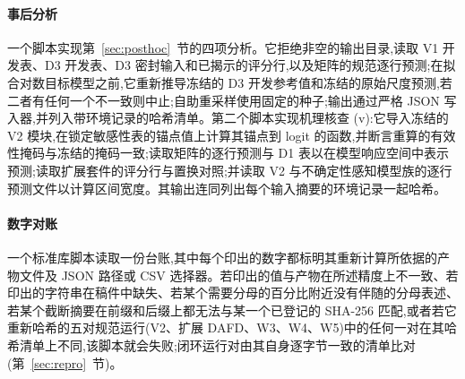 \documentclass[11pt,a4paper]{ctexart}
\begin{document}
\paragraph{事后分析} 一个脚本实现第~\ref{sec:posthoc}~节的四项分析。它拒绝非空的输出目录,读取 V1 开发表、D3 开发表、D3 密封输入和已揭示的评分行,以及矩阵的规范逐行预测;在拟合对数目标模型之前,它重新推导冻结的 D3 开发参考值和冻结的原始尺度预测,若二者有任何一个不一致则中止;自助重采样使用固定的种子;输出通过严格 JSON 写入器,并列入带环境记录的哈希清单。第二个脚本实现机理核查 (v):它导入冻结的 V2 模块,在锁定敏感性表的锚点值上计算其锚点到 logit 的函数,并断言重算的有效性掩码与冻结的掩码一致;读取矩阵的逐行预测与 D1 表以在模型响应空间中表示预测;读取扩展套件的评分行与置换对照;并读取 V2 与不确定性感知模型族的逐行预测文件以计算区间宽度。其输出连同列出每个输入摘要的环境记录一起哈希。

\paragraph{数字对账} 一个标准库脚本读取一份台账,其中每个印出的数字都标明其重新计算所依据的产物文件及 JSON 路径或 CSV 选择器。若印出的值与产物在所述精度上不一致、若印出的字符串在稿件中缺失、若某个需要分母的百分比附近没有伴随的分母表述、若某个截断摘要在前缀和后缀上都无法与某一个已登记的 SHA-256 匹配,或者若它重新哈希的五对规范运行(V2、扩展 DAFD、W3、W4、W5)中的任何一对在其哈希清单上不同,该脚本就会失败;闭环运行对由其自身逐字节一致的清单比对(第~\ref{sec:repro}~节)。

\clearpage
\end{document}
